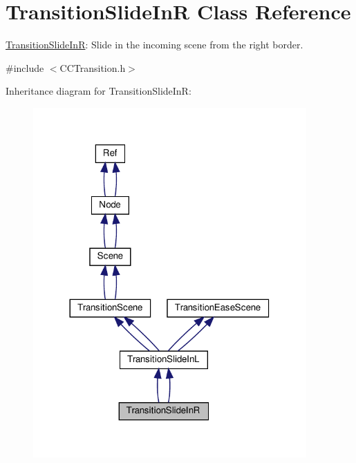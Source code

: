 \hypertarget{classTransitionSlideInR}{}\section{Transition\+Slide\+InR Class Reference}
\label{classTransitionSlideInR}


\hyperlink{classTransitionSlideInR}{Transition\+Slide\+InR}\+: Slide in the incoming scene from the right border.  




{\ttfamily \#include $<$C\+C\+Transition.\+h$>$}



Inheritance diagram for Transition\+Slide\+InR\+:
\nopagebreak
\begin{figure}[H]
\begin{center}
\leavevmode
\includegraphics[width=296pt]{classTransitionSlideInR__inherit__graph}
\end{center}
\end{figure}


